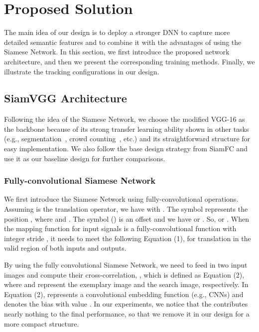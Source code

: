 \documentclass[runningheads]{llncs}
\begin{document}
\section{Proposed Solution}
\label{sec:proposed}

The main idea of our design is to deploy a stronger DNN to capture more detailed semantic features and to combine it with the advantages of using the Siamese Network. In this section, we first introduce the proposed network architecture, and then we present the corresponding training methods. Finally, we illustrate the tracking configurations in our design. 

\subsection{SiamVGG Architecture}

Following the idea of the Siamese Network, we choose the modified VGG-16 as the backbone because of its strong transfer learning ability shown in other tasks (e.g., segmentation~\cite{long2015fully}, crowd counting~\cite{li2018csrnet}, etc.) 
and its straightforward structure for easy implementation. We also follow the base design strategy from SiamFC and use it as our baseline design for further comparisons.
 
\subsubsection{Fully-convolutional Siamese Network}

We first introduce the Siamese Network using fully-convolutional operations. Assuming  is the translation operator, we have  with . The symbol  represents the position , where  and . 
The symbol  () is an offset and we have  or . So,  or . When the mapping function  for input signals is a fully-convolutional function with integer stride , it needs to meet the following Equation (1), for translation  in the valid region of both inputs and outputs.




By using the fully convolutional Siamese Network, we need to feed in two input images and compute their cross-correlation, , which is defined as Equation (2), where  and  represent the exemplary image and the search image, respectively. In Equation (2),  represents a convolutional embedding function (e.g., CNNs) and  denotes the bias with value . In our experiments, we notice that the  contributes nearly nothing to the final performance, so that we remove it in our design for a more compact structure.
\end{document}
